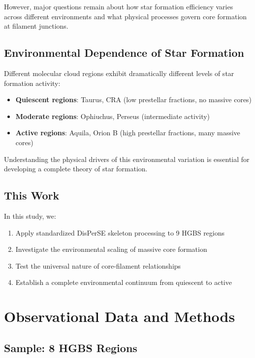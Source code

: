 \documentclass[11pt,a4paper]{article}
\begin{document}
However, major questions remain about how star formation efficiency varies across different environments and what physical processes govern core formation at filament junctions.

\subsection{Environmental Dependence of Star Formation}

Different molecular cloud regions exhibit dramatically different levels of star formation activity:
\begin{itemize}
    \item \textbf{Quiescent regions}: Taurus, CRA (low prestellar fractions, no massive cores)
    \item \textbf{Moderate regions}: Ophiuchus, Perseus (intermediate activity)
    \item \textbf{Active regions}: Aquila, Orion B (high prestellar fractions, many massive cores)
\end{itemize}

Understanding the physical drivers of this environmental variation is essential for developing a complete theory of star formation.

\subsection{This Work}

In this study, we:
\begin{enumerate}
    \item Apply standardized DisPerSE skeleton processing to 9 HGBS regions
    \item Investigate the environmental scaling of massive core formation
    \item Test the universal nature of core-filament relationships
    \item Establish a complete environmental continuum from quiescent to active
\end{enumerate}

\section{Observational Data and Methods}

\subsection{Sample: 8 HGBS Regions}
\end{document}
